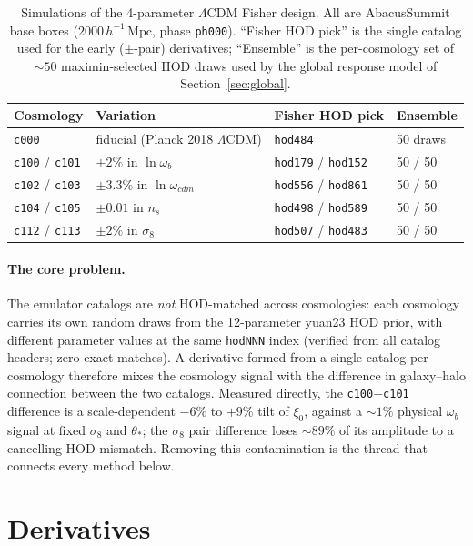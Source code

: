 \documentclass[11pt]{article}
\newcommand{\Mpch}{\,h^{-1}\,\mathrm{Mpc}}
\begin{document}
\begin{table}[ht]
\centering
\begin{tabular}{llll}
\toprule
Cosmology & Variation & Fisher HOD pick & Ensemble \\
\midrule
\texttt{c000} & fiducial (Planck 2018 $\Lambda$CDM) & \texttt{hod484} & 50 draws \\
\texttt{c100} / \texttt{c101} & $\pm 2\%$ in $\ln\omega_b$ & \texttt{hod179} / \texttt{hod152} & 50 / 50 \\
\texttt{c102} / \texttt{c103} & $\pm 3.3\%$ in $\ln\omega_{cdm}$ & \texttt{hod556} / \texttt{hod861} & 50 / 50 \\
\texttt{c104} / \texttt{c105} & $\pm 0.01$ in $n_s$ & \texttt{hod498} / \texttt{hod589} & 50 / 50 \\
\texttt{c112} / \texttt{c113} & $\pm 2\%$ in $\sigma_8$ & \texttt{hod507} / \texttt{hod483} & 50 / 50 \\
\bottomrule
\end{tabular}
\caption{Simulations of the 4-parameter $\Lambda$CDM Fisher design.  All are
AbacusSummit base boxes ($2000\Mpch$, phase \texttt{ph000}).  ``Fisher HOD
pick'' is the single catalog used for the early ($\pm$-pair) derivatives;
``Ensemble'' is the per-cosmology set of $\sim 50$ maximin-selected HOD
draws used by the global response model of Section~\ref{sec:global}.}
\label{tab:cosmologies}
\end{table}

\paragraph{The core problem.}
The emulator catalogs are \emph{not} HOD-matched across cosmologies: each
cosmology carries its own random draws from the 12-parameter yuan23 HOD
prior, with different parameter values at the same \texttt{hodNNN} index
(verified from all catalog headers; zero exact matches).  A derivative
formed from a single catalog per cosmology therefore mixes the cosmology
signal with the difference in galaxy--halo connection between the two
catalogs.  Measured directly, the \texttt{c100}$-$\texttt{c101} difference
is a scale-dependent $-6\%$ to $+9\%$ tilt of $\xi_0$, against a
$\sim 1\%$ physical $\omega_b$ signal at fixed $\sigma_8$ and
$\theta_\ast$; the $\sigma_8$ pair difference loses $\sim 89\%$ of its
amplitude to a cancelling HOD mismatch.  Removing this contamination is the
thread that connects every method below.

\section{Derivatives}
\label{sec:derivatives}
\end{document}

